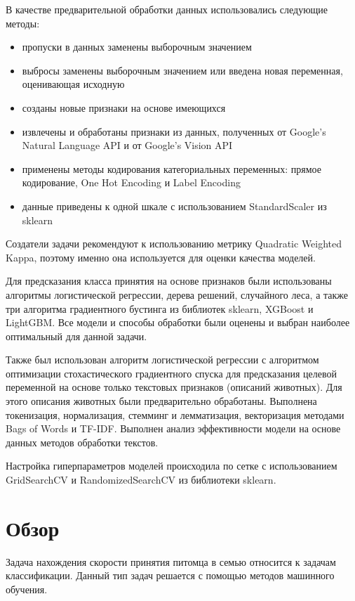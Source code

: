 \documentclass[14pt]{mmcs_article}
\begin{document}
В качестве предварительной обработки данных использовались следующие методы: 
\begin{itemize}
	\item пропуски в данных заменены выборочным значением
	\item выбросы заменены выборочным значением или введена новая переменная, оценивающая исходную
	\item созданы новые признаки на основе имеющихся
	\item извлечены и обработаны признаки из данных, полученных от Google’s Natural Language API и от Google’s Vision API
	\item применены методы кодирования категориальных переменных: прямое кодирование, One Hot Encoding и Label Encoding
	\item данные приведены к одной шкале с использованием StandardScaler из sklearn
\end{itemize}

Создатели задачи рекомендуют к использованию метрику Quadratic Weighted Kappa, поэтому именно она используется для оценки качества моделей.

Для предсказания класса принятия на основе признаков были использованы алгоритмы логистической регрессии, дерева решений, случайного леса, а также три алгоритма градиентного бустинга из библиотек sklearn, XGBoost и LightGBM. Все модели и способы обработки были оценены и выбран наиболее оптимальный для данной задачи.

Также был использован алгоритм логистической регрессии с алгоритмом оптимизации стохастического градиентного спуска для предсказания целевой переменной на основе только текстовых признаков (описаний животных). Для этого описания животных были предварительно обработаны. Выполнена токенизация, нормализация, стемминг и лемматизация, векторизация методами Bags of Words и TF-IDF. Выполнен анализ эффективности модели на основе данных методов обработки текстов.

Настройка гиперпараметров моделей происходила по сетке с использованием GridSearchCV и RandomizedSearchCV из библиотеки sklearn.




\newpage
{}
\section*{Обзор}

Задача нахождения скорости принятия питомца в семью относится к задачам классификации. Данный тип задач решается с помощью методов машинного обучения. 
 
\end{document}
